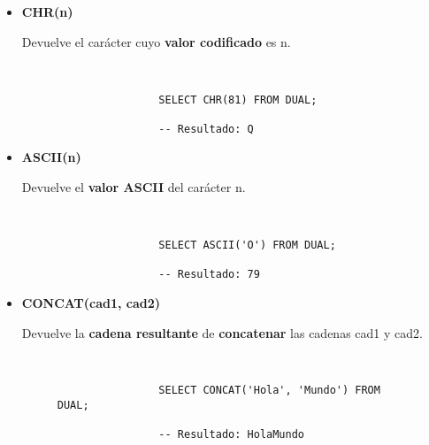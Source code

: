 \begin{itemize}
    \item \textbf{CHR(n)}

    Devuelve el carácter cuyo \textbf{valor codificado} es n.

      \begin{figure}[H]
        \begin{tcolorbox}[sharp corners, colback=yellow!30, colframe=white!20]
            \scriptsize
            \begin{verbatim}


                SELECT CHR(81) FROM DUAL;

                -- Resultado: Q
            \end{verbatim}
        \end{tcolorbox}
    \end{figure}

    \item \textbf{ASCII(n)}

    Devuelve el \textbf{valor ASCII }del carácter n.

    \begin{figure}[H]
        \begin{tcolorbox}[sharp corners, colback=yellow!30, colframe=white!20]
            \scriptsize
            \begin{verbatim}


                SELECT ASCII('O') FROM DUAL;

                -- Resultado: 79
            \end{verbatim}
        \end{tcolorbox}
    \end{figure}

    \item \textbf{CONCAT(cad1, cad2)}

    Devuelve la \textbf{cadena resultante} de \textbf{concatenar} las cadenas cad1 y cad2.

    \begin{figure}[H]
        \begin{tcolorbox}[sharp corners, colback=yellow!30, colframe=white!20]
            \scriptsize
            \begin{verbatim}


                SELECT CONCAT('Hola', 'Mundo') FROM DUAL;

                -- Resultado: HolaMundo
            \end{verbatim}
        \end{tcolorbox}
    \end{figure}


\end{itemize}

